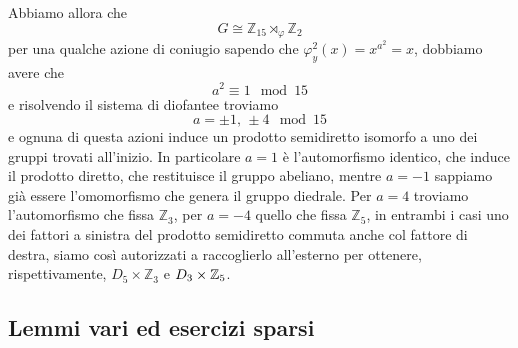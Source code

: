 \begin{multicols}{2}
Abbiamo allora che
\[ G \cong \mathbb{Z}_{15} \rtimes_\varphi \mathbb{Z}_2 \]
per una qualche azione di coniugio 
sapendo che $ \varphi_y^2(x) = x^{a^2} = x $, dobbiamo avere che $$  a^2 \equiv 1 \mod{15}  $$ e risolvendo il sistema di diofantee troviamo
\[ a = \pm 1,\, \pm 4 \mod{15} \]
e ognuna di questa azioni induce un prodotto semidiretto isomorfo a uno dei gruppi trovati all'inizio. In particolare $ a = 1 $ è l'automorfismo identico, che induce il prodotto diretto, che restituisce il gruppo abeliano, mentre $ a = -1 $ sappiamo già essere l'omomorfismo che genera il gruppo diedrale. Per $ a = 4 $ troviamo l'automorfismo che fissa $ \mathbb{Z}_3 $, per $ a = -4 $ quello che fissa $ \mathbb{Z}_5 $, in entrambi i casi uno dei fattori a sinistra del prodotto semidiretto commuta anche col fattore di destra, siamo così autorizzati a raccoglierlo all'esterno per ottenere, rispettivamente, $ D_5\times\mathbb{Z}_3 $ e $ D_{3}\times\mathbb{Z}_5 $.
	
	
\end{multicols}

\subsection{Lemmi vari ed esercizi sparsi}


